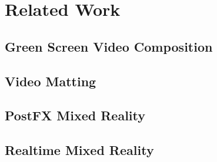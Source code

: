%
\chapter{Related Work}

\section{Green Screen Video Composition}
\section{Video Matting}
\section{PostFX Mixed Reality}
\section{Realtime Mixed Reality}